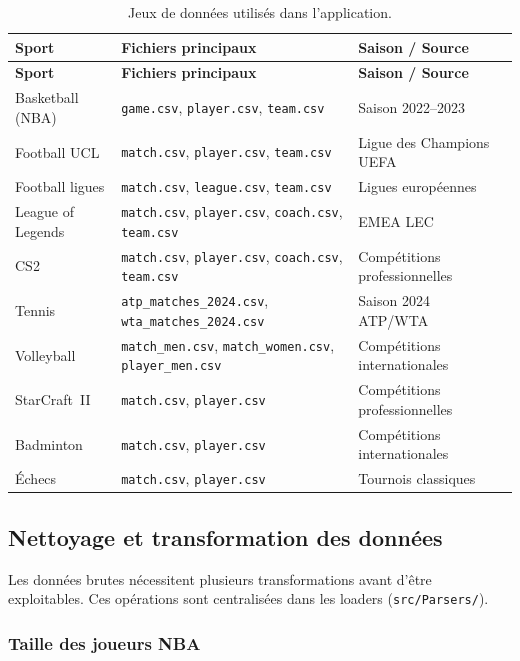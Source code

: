 \documentclass[12pt,a4paper]{article}
\newcommand{\code}[1]{\texttt{#1}}
\newcommand{\fichier}[1]{\texttt{#1}}
\begin{document}
\begin{center}
\begin{longtable}{llll}
  \caption{Jeux de données utilisés dans l'application.}
  \label{tab:datasets}\\
  \toprule
  \textbf{Sport} & \textbf{Fichiers principaux} & \textbf{Saison / Source} \\
  \midrule
  \endfirsthead
  \toprule
  \textbf{Sport} & \textbf{Fichiers principaux} & \textbf{Saison / Source} \\
  \midrule
  \endhead
  \bottomrule
  \endfoot
  Basketball (NBA) & \code{game.csv}, \code{player.csv}, \code{team.csv}
    & Saison 2022--2023 \\
  Football UCL & \code{match.csv}, \code{player.csv}, \code{team.csv}
    & Ligue des Champions UEFA \\
  Football ligues & \code{match.csv}, \code{league.csv}, \code{team.csv}
    & Ligues européennes \\
  League of Legends & \code{match.csv}, \code{player.csv}, \code{coach.csv}, \code{team.csv}
    & EMEA LEC \\
  CS2 & \code{match.csv}, \code{player.csv}, \code{coach.csv}, \code{team.csv}
    & Compétitions professionnelles \\
  Tennis & \code{atp\_matches\_2024.csv}, \code{wta\_matches\_2024.csv}
    & Saison 2024 ATP/WTA \\
  Volleyball & \code{match\_men.csv}, \code{match\_women.csv}, \code{player\_men.csv}
    & Compétitions internationales \\
  StarCraft~II & \code{match.csv}, \code{player.csv}
    & Compétitions professionnelles \\
  Badminton & \code{match.csv}, \code{player.csv}
    & Compétitions internationales \\
  Échecs & \code{match.csv}, \code{player.csv}
    & Tournois classiques \\
\end{longtable}
\end{center}

\subsection{Nettoyage et transformation des données}

Les données brutes nécessitent plusieurs transformations avant d'être
exploitables. Ces opérations sont centralisées dans les loaders
(\fichier{src/Parsers/}).

\subsubsection{Taille des joueurs NBA}
\end{document}
